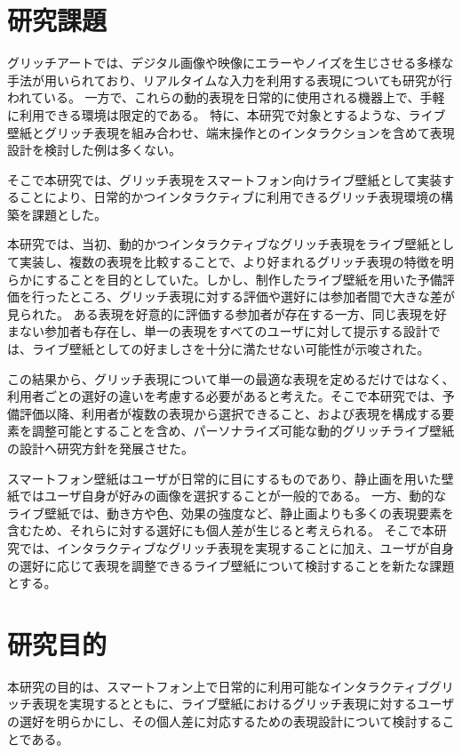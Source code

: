 \section{研究課題}

グリッチアートでは、デジタル画像や映像にエラーやノイズを生じさせる多様な手法が用いられており、リアルタイムな入力を利用する表現についても研究が行われている。
一方で、これらの動的表現を日常的に使用される機器上で、手軽に利用できる環境は限定的である。
特に、本研究で対象とするような、ライブ壁紙とグリッチ表現を組み合わせ、端末操作とのインタラクションを含めて表現設計を検討した例は多くない。

そこで本研究では、グリッチ表現をスマートフォン向けライブ壁紙として実装することにより、日常的かつインタラクティブに利用できるグリッチ表現環境の構築を課題とした。

本研究では、当初、動的かつインタラクティブなグリッチ表現をライブ壁紙として実装し、複数の表現を比較することで、より好まれるグリッチ表現の特徴を明らかにすることを目的としていた。しかし、制作したライブ壁紙を用いた予備評価を行ったところ、グリッチ表現に対する評価や選好には参加者間で大きな差が見られた。
ある表現を好意的に評価する参加者が存在する一方、同じ表現を好まない参加者も存在し、単一の表現をすべてのユーザに対して提示する設計では、ライブ壁紙としての好ましさを十分に満たせない可能性が示唆された。

この結果から、グリッチ表現について単一の最適な表現を定めるだけではなく、利用者ごとの選好の違いを考慮する必要があると考えた。そこで本研究では、予備評価以降、利用者が複数の表現から選択できること、および表現を構成する要素を調整可能とすることを含め、パーソナライズ可能な動的グリッチライブ壁紙の設計へ研究方針を発展させた。

スマートフォン壁紙はユーザが日常的に目にするものであり、静止画を用いた壁紙ではユーザ自身が好みの画像を選択することが一般的である。
一方、動的なライブ壁紙では、動き方や色、効果の強度など、静止画よりも多くの表現要素を含むため、それらに対する選好にも個人差が生じると考えられる。
そこで本研究では、インタラクティブなグリッチ表現を実現することに加え、ユーザが自身の選好に応じて表現を調整できるライブ壁紙について検討することを新たな課題とする。

\section{研究目的}

本研究の目的は、スマートフォン上で日常的に利用可能なインタラクティブグリッチ表現を実現するとともに、ライブ壁紙におけるグリッチ表現に対するユーザの選好を明らかにし、その個人差に対応するための表現設計について検討することである。

